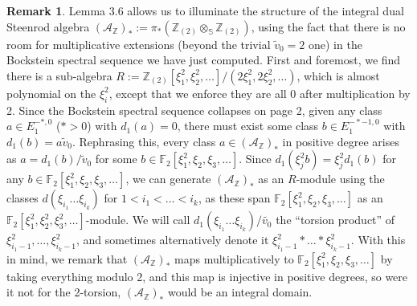 \documentclass[11pt,leqno]{article}
\newcommand{\zz}{\mathbb{Z}}
\newcommand{\sss}{\mathbb{S}}
\newcommand{\mc}[1]{\mathcal{#1}}
\newcommand{\fff}{\mathbb{F}}
\newtheorem*{short hand}{theorem name}
\theoremstyle{plain}  %
\theoremstyle{definition}
\newtheorem{remark}{Remark}[section]
\numberwithin{equation}{section}
\begin{document}
\begin{remark}\label{remark3.8}
Lemma 3.6 allows us to illuminate the structure of the integral dual Steenrod algebra $(\mc{A}_{\zz})_*:=\pi_*(\zz_{(2)}\otimes_{\sss}\zz_{(2)})$, using the fact that there is no room for multiplicative extensions (beyond the trivial $\tilde{v}_0=2$ one) in the Bockstein spectral sequence we have just computed.  First and foremost, we find there is a sub-algebra $R:=\zz_{(2)}[\xi_1^2,\xi_2^2,\ldots]/(2\xi_1^2,2\xi_2^2,\ldots)$, which is almost polynomial on the $\xi_i^2$, except that we enforce they are all $0$ after multiplication by 2.  Since the Bockstein spectral sequence collapses on page 2, given any class $a\in E_1^{-*,0}$ ($*>0$) with $d_1(a)=0$, there must exist some class $b\in E_1^{-*-1,0}$ with $d_1(b)=a\tilde{v}_0$.  Rephrasing this, every class $a\in (\mc{A}_{\zz})_*$ in positive degree arises as $a=d_1(b)/\tilde{v}_0$ for some $b\in \fff_2[\xi_1^2,\xi_2,\xi_3,\ldots]$.  Since $d_1(\xi_j^2b)=\xi_j^2d_1(b)$ for any $b\in\fff_2[\xi_1^2,\xi_2,\xi_3,\ldots]$, we can generate $(\mc{A}_{\zz})_*$ as an $R$-module using the classes $d(\xi_{i_1}\ldots\xi_{i_k})$ for $1<i_1<\ldots <i_k$, as these span $\fff_2[\xi_1^2,\xi_2,\xi_3,\ldots]$ as an $\fff_2[\xi_1^2,\xi_2^2,\xi_3^2,\ldots]$-module.  We will call $d_1(\xi_{i_1}\ldots \xi_{i_k})/\tilde{v_0}$ the ``torsion product'' of $\xi_{i_1-1}^2,\ldots, \xi_{i_k-1}^2$, and sometimes alternatively denote it $\xi_{i_1-1}^2*\ldots*\xi_{i_k-1}^2$.  With this in mind, we remark that $(\mc{A}_{\zz})_*$ maps multiplicatively to $\fff_2[\xi_1^2,\xi_2,\xi_3,\ldots]$ by taking everything modulo 2, and this map is injective in positive degrees, so were it not for the 2-torsion, $(\mc{A}_{\zz})_*$ would be an integral domain.
\end{remark}
\end{document}

